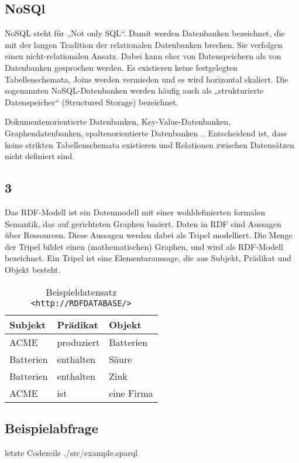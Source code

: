 \subsection{NoSQl}
NoSQL steht für „Not only SQL“. Damit werden Datenbanken bezeichnet, die mit der langen Tradition der relationalen Datenbanken brechen. Sie verfolgen einen nicht-relationalen Ansatz. Dabei kann eher von Datenspeichern als von Datenbanken gesprochen werden.
Es existieren keine festgelegten Tabellenschemata, Joins werden vermieden und es wird horizontal skaliert. Die sogenannten NoSQL-Datenbanken werden häufig auch als „strukturierte Datenspeicher“ (Structured Storage) bezeichnet.

Dokumentenorientierte Datenbanken, Key-Value-Datenbanken, Graphendatenbanken, spaltenorientierte Datenbanken .. Entscheidend ist, dass keine strikten Tabellenschemata existieren und Relationen zwischen Datensätzen nicht definiert sind.

\subsection{3}
Das RDF-Modell ist ein Datenmodell mit einer wohldefinierten formalen Semantik, das auf gerichteten Graphen basiert. Daten in RDF sind Aussagen über Ressourcen. Diese Aussagen werden dabei als Tripel modelliert. Die Menge der Tripel bildet einen (mathematischen) Graphen, und wird als RDF-Modell bezeichnet. Ein Tripel ist eine Elementaraussage, die aus Subjekt, Prädikat und Objekt besteht.

 \begin{table}[h]
 \centering
 \caption{Beispieldatensatz \texttt{<http://RDFDATABASE/>} \cite{wiki:rdf}}
   \begin{tabular}{lll}
  Subjekt & Prädikat & Objekt \\ 
  \hline
  ACME & produziert & Batterien \\
  Batterien & enthalten &  Säure \\
  Batterien & enthalten & Zink \\
  ACME & ist & eine Firma
 \end{tabular}
 \end{table}

\subsection{Beispielabfrage}

 letzte Codezeile
{./src/example.sparql}

